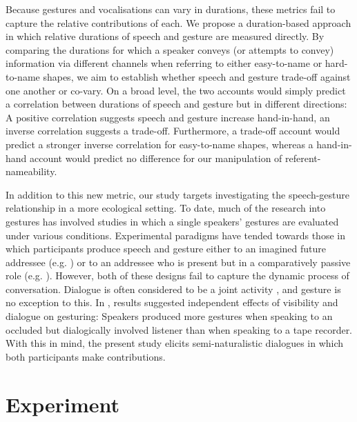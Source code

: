 \documentclass[a4paper,man,natbib]{apa6}
\begin{document}
Because gestures and vocalisations can vary in durations, these metrics fail to capture the relative contributions of each.
We propose a duration-based approach in which relative durations of speech and gesture are measured directly.
By comparing the durations for which a speaker conveys (or attempts to convey) information via different channels when referring to either easy-to-name or hard-to-name shapes, we aim to establish whether speech and gesture trade-off against one another or co-vary.
On a broad level, the two accounts would simply predict a correlation between durations of speech and gesture but in different directions: A positive correlation suggests speech and gesture increase hand-in-hand, an inverse correlation suggests a trade-off.
Furthermore, a trade-off account would predict a stronger inverse correlation for easy-to-name shapes, whereas a hand-in-hand account would predict no difference for our manipulation of referent-nameability.

In addition to this new metric, our study targets investigating the speech-gesture relationship in a more ecological setting. 
To date, much of the research into gestures has involved studies in which a single speakers' gestures are evaluated under various conditions.
Experimental paradigms have tended towards those in which participants produce speech and gesture either to an imagined future addressee (e.g. \citet{Morsella2004, Wesp2001}) or to an addressee who is present but in a comparatively passive role (e.g. \citet{DeRuiter2012, Bangerter2004, Holler2007, Hoetjes2015}).
However, both of these designs fail to capture the dynamic process of conversation. 
Dialogue is often considered to be a joint activity \citep{Clark1996}, and gesture is no exception to this.
In \citet{Bavelas2008}, results suggested independent effects of visibility and dialogue on gesturing: Speakers produced more gestures when speaking to an occluded but dialogically involved listener than when speaking to a tape recorder. 
With this in mind, the present study elicits semi-naturalistic dialogues in which both participants make contributions. 


\section{Experiment}
\end{document}
